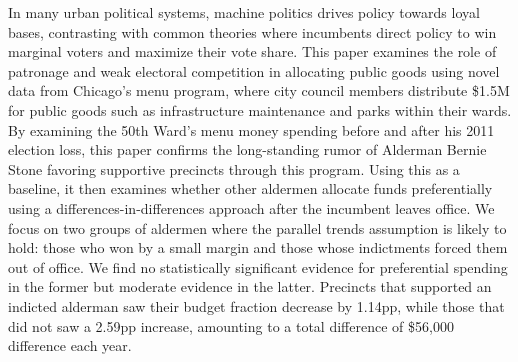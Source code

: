 \begin{spacing}{1.0}
    In many urban political systems, machine politics drives policy towards loyal bases, contrasting with common theories where incumbents direct policy to win marginal voters and maximize their vote share.
    This paper examines the role of patronage and weak electoral competition in allocating public goods using novel data from Chicago's menu program, where city council members distribute \$1.5M for public goods such as infrastructure maintenance and parks within their wards.
    By examining the 50th Ward's menu money spending before and after his 2011 election loss, this paper confirms the long-standing rumor of Alderman Bernie Stone favoring supportive precincts through this program.
    Using this as a baseline, it then examines whether other aldermen allocate funds preferentially using a differences-in-differences approach after the incumbent leaves office.
    We focus on two groups of aldermen where the parallel trends assumption is likely to hold: those who won by a small margin and those whose indictments forced them out of office.
    We find no statistically significant evidence for preferential spending in the former but moderate evidence in the latter.
    Precincts that supported an indicted alderman saw their budget fraction decrease by 1.14pp, while those that did not saw a 2.59pp increase, amounting to a total difference of \$56,000 difference each year.
\end{spacing}